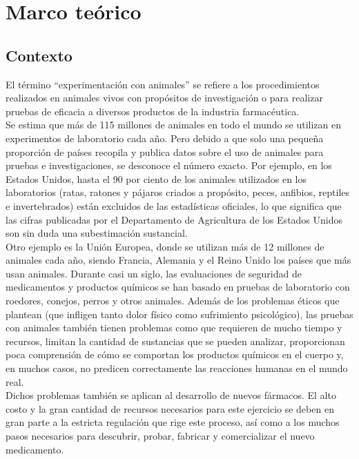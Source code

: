 \rhead{\newtitle}
\cfoot{\thepage}
\renewcommand{\headrulewidth}{1pt}
\renewcommand{\footrulewidth}{1pt}

\chapter{Marco teórico}\label{ch_1}
\section{Contexto}
\noindent El término ``experimentación con animales'' se refiere a los procedimientos realizados en animales vivos con propósitos de investigación o para realizar pruebas de eficacia a diversos productos de la industria farmacéutica.\\

\noindent Se estima que más de 115 millones de animales en todo el mundo se utilizan en experimentos de laboratorio cada año. Pero debido a que solo una pequeña proporción de países recopila y publica datos sobre el uso de animales para pruebas e investigaciones, se desconoce el número exacto. Por ejemplo, en los Estados Unidos, hasta el 90 por ciento de los animales utilizados en los laboratorios (ratas, ratones y pájaros criados a propósito, peces, anfibios, reptiles e invertebrados) están excluidos de las estadísticas oficiales, lo que significa que las cifras publicadas por el Departamento de Agricultura de los Estados Unidos son sin duda una subestimación sustancial.\\

\noindent Otro ejemplo es la Unión Europea, donde se utilizan más de 12 millones de animales cada año, siendo Francia, Alemania y el Reino Unido los países que más usan animales.
Durante casi un siglo, las evaluaciones de seguridad de medicamentos y productos químicos se han basado en pruebas de laboratorio con roedores, conejos, perros y otros animales. Además de los problemas éticos que plantean (que infligen tanto dolor físico como sufrimiento psicológico), las pruebas con animales también tienen problemas como que requieren de mucho tiempo y recursos, limitan la cantidad de sustancias que se pueden analizar, proporcionan poca comprensión de cómo se comportan los productos químicos en el cuerpo y, en muchos casos, no predicen correctamente las reacciones humanas en el mundo real.\cite{1}\\

\noindent Dichos problemas también se aplican al desarrollo de nuevos fármacos. El alto costo y la gran cantidad de recursos necesarios para este ejercicio se deben en gran parte a la estricta regulación que rige este proceso, así como a los muchos pasos necesarios para descubrir, probar, fabricar y comercializar el nuevo medicamento.\\


